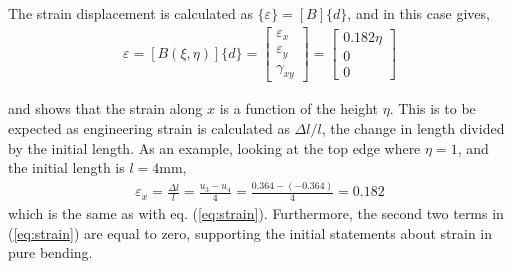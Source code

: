 \documentclass{article}
\begin{document}
\begin{enumerate}
The strain displacement is calculated as $\{\varepsilon\} = [B]\{d\}$, and in this case gives, 
\begin{align}
	\varepsilon = [B(\xi, \eta)]\{d\} = \begin{bmatrix} \varepsilon_x \\ \varepsilon_y \\ \gamma_{xy} \end{bmatrix} = \begin{bmatrix} 0.182 \eta \\ 0 \\ 0 \end{bmatrix} \label{eq:strain}	
\end{align}

and shows that the strain along $x$ is a function of the height $\eta$. This is to be expected as engineering strain is calculated as $\Delta l/l$, the change in length divided by the initial length. As an example, looking at the top edge where $\eta = 1$, and the initial length is $l=4$mm, 
\begin{align}
	\varepsilon_x = \frac{\Delta l}{l} = \frac{u_3-u_4}{4} = \frac{0.364-(-0.364)}{4} = 0.182
\end{align}
which is the same as with eq. (\ref{eq:strain}). 
Furthermore, the second two terms in (\ref{eq:strain}) are equal to zero, supporting the initial statements about strain in pure bending. 


\end{enumerate}
\end{document}
